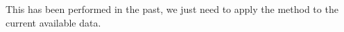 This has been performed in the past, we just need to apply the method to the 
current available data.
